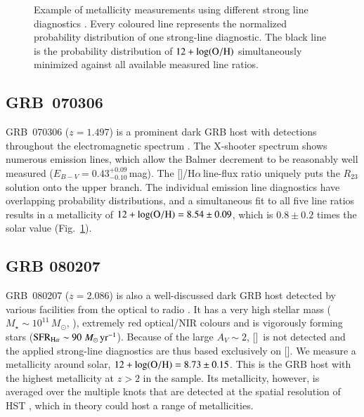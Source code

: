\documentclass[traditabstract, longauth]{aa}
\newcommand{\ha}{H$\alpha$}
\newcommand{\oh}{12+\log(\rm{O/H})}
\newcommand{\oii}{[\ion{O}{ii}]}
\newcommand{\nii}{[\ion{N}{ii}]}
\newcommand{\Msun}{$M_\odot$}
\newcommand{\Msunyr}{$M_\odot\,\rm{yr}^{-1}$}
\begin{document}
\begin{appendix}
\begin{figure}
\begin{subfigure}{.33\textwidth}
\end{subfigure}
\caption{Example of metallicity measurements using different strong line diagnostics \citep{2006A&A...459...85N, 2008A&A...488..463M}. Every coloured line represents the normalized probability distribution of one strong-line diagnostic. The black line is the probability distribution of $\oh$ simultaneously minimized against all available measured line ratios.}
\label{fig:zexamples}
\end{figure}

\subsection{GRB~070306} GRB~070306 ($z=1.497$) is a prominent dark GRB host with detections throughout the electromagnetic spectrum \citep{2014A&A...565A.112H, 2014arXiv1408.5076S, 2015ApJ...801..102P}. The X-shooter spectrum shows numerous emission lines, which allow the Balmer decrement to be reasonably well measured ($E_{B-V} = 0.43_{-0.10}^{+0.09}$\,mag). The \nii/\ha\,line-flux ratio uniquely puts the $R_{23}$ solution onto the upper branch. The individual emission line diagnostics have overlapping probability distributions, and a simultaneous fit to all five line ratios results in a metallicity of $\oh=8.54\pm0.09$, which is $0.8\pm0.2$ times the solar value (Fig.~\ref{fig:zexamples}).

\subsection{GRB 080207} GRB~080207 ($z=2.086$) is also a well-discussed dark GRB host detected by various facilities from the optical to radio \citep[e.g.,][]{2011ApJ...736L..36H, 2012MNRAS.421...25S, 2012A&A...545A..77R}. It has a very high stellar mass ($M_{\star}\sim10^{11}$\,\Msun, \citealt{2013ApJ...778..128P}), extremely red optical/NIR colours and is vigorously forming stars ($\rm{SFR}_{\rm{H\alpha}}\sim 90\,$\Msunyr). Because of the large $A_V\sim2$, \oii\, is not detected and the applied strong-line diagnostics are thus based exclusively on \nii. We measure a metallicity around solar, $\oh = 8.73\pm0.15$. This is the GRB host with the highest metallicity at $z>2$ in the sample. Its metallicity, however, is averaged over the multiple knots that are detected at the spatial resolution of HST \citep{2012MNRAS.421...25S}, which in theory could host a range of metallicities. 


\end{appendix}
\end{document}
